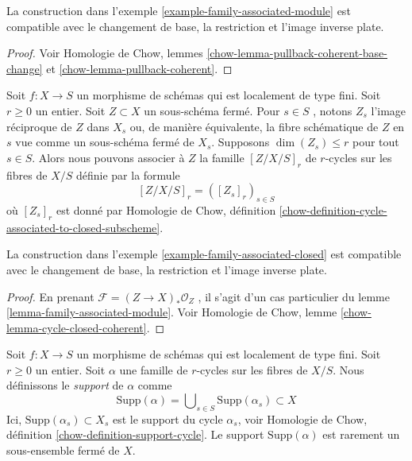 \begin{lemma} 
\label{lemma-family-associated-module} La
 construction dans l'exemple  \ref{example-family-associated-module}  est 
compatible avec le changement de base, la restriction et l'image inverse plate. 
\end{lemma} 

\begin{proof} 
Voir Homologie de Chow, lemmes  
\ref{chow-lemma-pullback-coherent-base-change}  et  
\ref{chow-lemma-pullback-coherent}. 
\end{proof} 

\begin{example} 
\label{example-family-associated-closed} 
Soit  $f : X \to S$  un morphisme de schémas qui est localement de type fini. 
Soit $r \geq 0$  un entier. Soit  $Z \subset X$  un sous-schéma fermé. 
Pour  $s \in S$ , notons  $Z_s$  l'image réciproque de  $Z$  dans  $X_s$
  ou, de manière équivalente, la fibre schématique de  $Z$  en  $s$  vue 
comme un sous-schéma fermé de  $X_s$. 
Supposons  $\dim(Z_s) \leq r$  pour tout $s \in S$.
 Alors nous pouvons associer à  $Z$  la famille  $[Z/X/S]_r$
 de  $r$-cycles sur les fibres de  $X/S$  définie par la formule 
$$
[Z/X/S]_r = ([Z_s]_r)_{s \in S}
$$
 où  $[Z_s]_r$  est donné par
 Homologie de Chow, définition  
\ref{chow-definition-cycle-associated-to-closed-subscheme}. 
\end{example} 

\begin{lemma} 
\label{lemma-family-associated-closed} La
 construction dans l'exemple  \ref{example-family-associated-closed}  est 
compatible avec le changement de base, la restriction et l'image inverse plate. 
\end{lemma} 

\begin{proof} En
 prenant  $\mathcal{F} = (Z \to X)_*\mathcal{O}_Z$ , il s'agit d'un cas particulier du
 lemme  \ref{lemma-family-associated-module}. Voir 
Homologie de Chow, lemme \ref{chow-lemma-cycle-closed-coherent}. 
\end{proof} 

\begin{remark}[Support] 
\label{remark-supports-family} 
Soit $f : X \to S$ un morphisme de schémas qui est localement de type fini. 
Soit $r \geq 0$ un entier. Soit $\alpha$ une famille de $r$-cycles 
sur les fibres de $X/S$. Nous définissons le {\it support} de $\alpha$ comme 
$$
\text{Supp}(\alpha) =
\bigcup\nolimits_{s \in S} \text{Supp}(\alpha_s) \subset X
$$
 Ici,  $\text{Supp}(\alpha_s) \subset X_s$  est 
le support du cycle  $\alpha_s$, voir
 Homologie de Chow, définition  \ref{chow-definition-support-cycle}. 
Le support  $\text{Supp}(\alpha)$  est rarement un sous-ensemble fermé de  $X$. 
\end{remark} 

